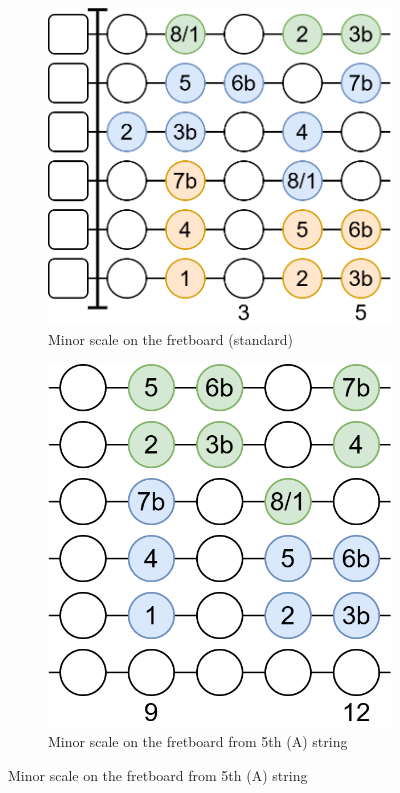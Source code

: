 \newpage

\begin{figure}[h]
	\begin{subfigure}[b]{0.45\textwidth}
		\centering
		\includegraphics[height=0.175\textheight]{../../Images/guitar_minor_scale_standard.png}
		\caption{Minor scale on the fretboard (standard)}
		\label{fig:guitar_minor_scale_fretboard_standard}
	\end{subfigure}
	\hfill
	\begin{subfigure}[b]{0.45\textwidth}
		\centering
		\includegraphics[height=0.175\textheight]{../../Images/guitar_minor_scale_standard_start_5th_string.png}
		\caption{Minor scale on the fretboard from 5th (A) string}
		\label{fig:guitar_minor_scale_fretboard_standard_start_5th_string}
	\end{subfigure}
	

\end{figure}
